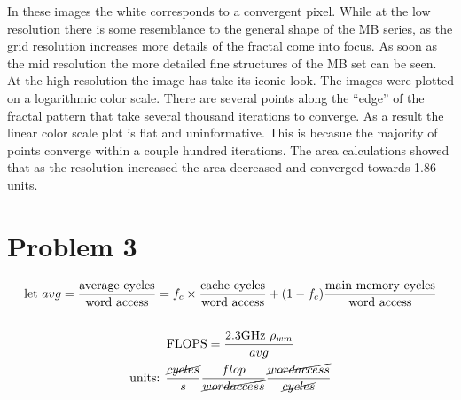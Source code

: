 \documentclass[12pt]{exam}
\begin{document}
\begin{enumerate}
                In these images the white corresponds to a convergent pixel. While at the low resolution there is some resemblance to the general shape of the MB series, as the grid resolution increases more details of the fractal come into focus. As soon as the mid resolution the more detailed fine structures of the MB set can be seen. At the high resolution the image has take its iconic look. The images were plotted on a logarithmic color scale. There are several points along the ``edge'' of the fractal pattern that take several thousand iterations to converge. As a result the linear color scale plot is flat and uninformative. This is becasue the majority of points converge within a couple hundred iterations. The area calculations showed that as the resolution increased the area decreased and converged towards 1.86 units.


                \begin{center}
                \end{center}


        \end{enumerate}
        
    \section*{\label{sec:prob3} Problem 3}

        
        \begin{gather*}
            \text{let  } avg = \frac{\text{average cycles}}{\text{word access}} = f_c \times \frac{\text{cache cycles}}{\text{word access}} + (1-f_c) \frac{\text{main memory cycles}}{\text{word access}} \\ 
            \\
            \text{FLOPS} = \frac{2.3\text{GHz } \rho_{wm}}{avg} 
            \\
            \text{units:  } \frac{\text{\( \cancel{cycles}\)}}{s} \frac{flop}{\text{\( \cancel{word access} \)}} \frac{\text{\( \cancel{word access} \)}}{\text{\( \cancel{cycles}\)}}
        \end{gather*}
\end{document}
